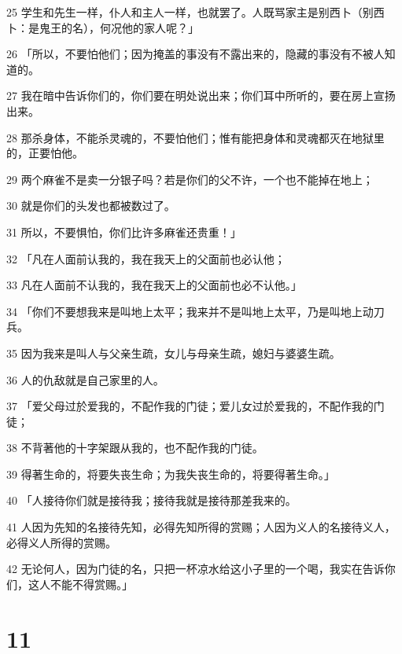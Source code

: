 \par 25 学生和先生一样，仆人和主人一样，也就罢了。人既骂家主是别西卜（别西卜：是鬼王的名），何况他的家人呢？」
\par 26 「所以，不要怕他们；因为掩盖的事没有不露出来的，隐藏的事没有不被人知道的。
\par 27 我在暗中告诉你们的，你们要在明处说出来；你们耳中所听的，要在房上宣扬出来。
\par 28 那杀身体，不能杀灵魂的，不要怕他们；惟有能把身体和灵魂都灭在地狱里的，正要怕他。
\par 29 两个麻雀不是卖一分银子吗？若是你们的父不许，一个也不能掉在地上；
\par 30 就是你们的头发也都被数过了。
\par 31 所以，不要惧怕，你们比许多麻雀还贵重！」
\par 32 「凡在人面前认我的，我在我天上的父面前也必认他；
\par 33 凡在人面前不认我的，我在我天上的父面前也必不认他。」
\par 34 「你们不要想我来是叫地上太平；我来并不是叫地上太平，乃是叫地上动刀兵。
\par 35 因为我来是叫人与父亲生疏，女儿与母亲生疏，媳妇与婆婆生疏。
\par 36 人的仇敌就是自己家里的人。
\par 37 「爱父母过於爱我的，不配作我的门徒；爱儿女过於爱我的，不配作我的门徒；
\par 38 不背著他的十字架跟从我的，也不配作我的门徒。
\par 39 得著生命的，将要失丧生命；为我失丧生命的，将要得著生命。」
\par 40 「人接待你们就是接待我；接待我就是接待那差我来的。
\par 41 人因为先知的名接待先知，必得先知所得的赏赐；人因为义人的名接待义人，必得义人所得的赏赐。
\par 42 无论何人，因为门徒的名，只把一杯凉水给这小子里的一个喝，我实在告诉你们，这人不能不得赏赐。」

\chapter{11}

